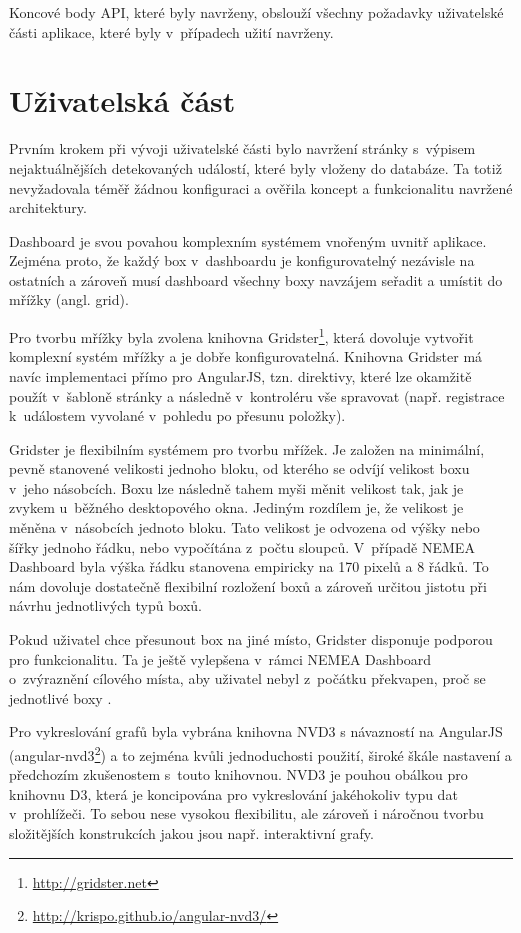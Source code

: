 Koncové body API, které byly navrženy, obslouží všechny požadavky uživatelské části aplikace, které byly v~případech užití navrženy.

\section{Uživatelská část}

Prvním krokem při vývoji uživatelské části bylo navržení stránky s~výpisem nejaktuálnějších detekovaných událostí, které byly vloženy do databáze. Ta totiž nevyžadovala téměř žádnou konfiguraci a ověřila koncept a funkcionalitu navržené architektury.

Dashboard je svou povahou komplexním systémem vnořeným uvnitř aplikace. Zejména proto, že každý box v~dashboardu je konfigurovatelný nezávisle na ostatních a zároveň musí dashboard všechny boxy navzájem seřadit a umístit do mřížky (angl. grid).

Pro tvorbu mřížky byla zvolena knihovna Gridster\footnote{\url{http://gridster.net}}, která dovoluje vytvořit komplexní systém mřížky a je dobře konfigurovatelná. Knihovna Gridster má navíc implementaci přímo pro AngularJS, tzn. direktivy, které lze okamžitě použít v~šabloně stránky a následně v~kontroléru vše spravovat (např. registrace k~událostem vyvolané v~pohledu po přesunu položky).

Gridster je flexibilním systémem pro tvorbu mřížek. Je založen na minimální, pevně stanovené velikosti jednoho bloku, od kterého se odvíjí velikost boxu v~jeho násobcích. Boxu lze následně tahem myši měnit velikost tak, jak je zvykem u~běžného desktopového okna. Jediným rozdílem je, že velikost je měněna v~násobcích jednoto bloku. Tato velikost je odvozena od výšky nebo šířky jednoho řádku, nebo vypočítána z~počtu sloupců. V~případě NEMEA Dashboard byla výška řádku stanovena empiricky na 170 pixelů a 8 řádků. To nám dovoluje dostatečně flexibilní rozložení boxů a zároveň určitou jistotu při návrhu jednotlivých typů boxů.

Pokud uživatel chce přesunout box na jiné místo, Gridster disponuje podporou pro  funkcionalitu. Ta je ještě vylepšena v~rámci NEMEA Dashboard o~zvýraznění cílového místa, aby uživatel nebyl z~počátku překvapen, proč se jednotlivé boxy .

Pro vykreslování grafů byla vybrána knihovna NVD3 s návazností na AngularJS (angular-nvd3\footnote{\url{http://krispo.github.io/angular-nvd3/}}) a to zejména kvůli jednoduchosti použití, široké škále nastavení a předchozím zkušenostem s~touto knihovnou. NVD3 je pouhou obálkou pro knihovnu D3, která je koncipována pro vykreslování jakéhokoliv typu dat v~prohlížeči. To sebou nese vysokou flexibilitu, ale zároveň i náročnou tvorbu složitějších konstrukcích jakou jsou např. interaktivní grafy.

